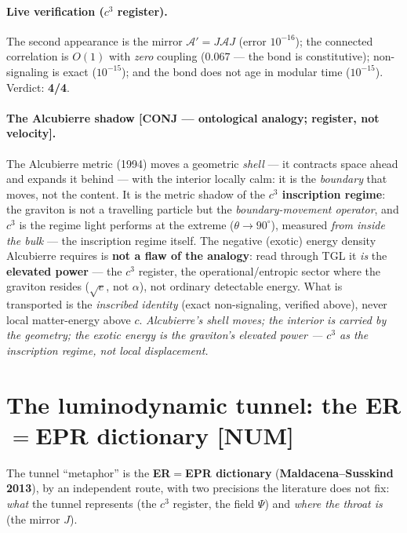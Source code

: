 \documentclass[11pt]{article}
\theoremstyle{definition}\newtheorem{deriv}{Derivation}
\begin{document}
\paragraph{Live verification ($c^3$ register).} The second appearance is the mirror $\mathcal{A}'=J\mathcal{A}J$ (error $10^{-16}$); the connected correlation is $O(1)$ with \emph{zero} coupling ($0.067$ --- the bond is constitutive); non-signaling is exact ($10^{-15}$); and the bond does not age in modular time ($10^{-15}$). Verdict: \textbf{4/4}.

\paragraph{The Alcubierre shadow \textsf{[CONJ --- ontological analogy; register, not velocity]}.} The Alcubierre metric (1994) moves a geometric \emph{shell} --- it contracts space ahead and expands it behind --- with the interior locally calm: it is the \emph{boundary} that moves, not the content. It is the metric shadow of the \textbf{$c^3$ inscription regime}: the graviton is not a travelling particle but the \emph{boundary-movement operator}, and $c^3$ is the regime light performs at the extreme ($\theta\to90^\circ$), measured \emph{from inside the bulk} --- the inscription regime itself. The negative (exotic) energy density Alcubierre requires is \textbf{not a flaw of the analogy}: read through TGL it \emph{is} the \textbf{elevated power} --- the $c^3$ register, the operational/entropic sector where the graviton resides ($\sqrt e$, not $\alpha$), not ordinary detectable energy. What is transported is the \emph{inscribed identity} (exact non-signaling, verified above), never local matter-energy above $c$. \emph{Alcubierre's shell moves; the interior is carried by the geometry; the exotic energy is the graviton's elevated power --- $c^3$ as the inscription regime, not local displacement.}

\section{The luminodynamic tunnel: the ER$=$EPR dictionary \textsf{[NUM]}}

The tunnel ``metaphor'' is the \textbf{ER$=$EPR dictionary} (\textbf{Maldacena--Susskind 2013}), by an independent route, with two precisions the literature does not fix: \emph{what} the tunnel represents (the $c^3$ register, the field $\Psi$) and \emph{where the throat is} (the mirror $J$).
\end{document}
